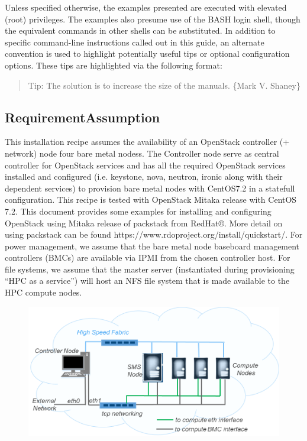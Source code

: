 \documentclass[12pt]{article}
\begin{document}
Unless specified otherwise, the examples presented are executed with elevated (root) privileges. The
examples also presume use of the BASH login shell, though the equivalent commands in other shells can
be substituted. In addition to specific command-line instructions called out in this guide, an alternate
convention is used to highlight potentially useful tips or optional configuration options. These tips are
highlighted via the following format:

\begin{quote}Tip:
\small{The solution is to increase the size of the manuals. \{Mark V. Shaney\}} 
\end{quote}


\subsection*{RequirementAssumption}

This installation recipe assumes the availability of an OpenStack controller (+ network) node four bare metal nodess. The Controller node serve as central controller for OpenStack services and has all the required OpenStack services installed and configured (i.e. keystone, nova, neutron, ironic along with their dependent services) to provision bare metal nodes with CentOS7.2 in a statefull configuration. 
This recipe is tested with OpenStack Mitaka release with CentOS 7.2. This document provides some examples for installing and configuring OpenStack using Mitaka release of packstack from RedHat®. More detail on using packstack can be found https://www.rdoproject.org/install/quickstart/. 
For power management, we assume that the bare metal node baseboard management controllers (BMCs) are available via IPMI from the chosen controller host. For file systems, we assume that the master server (instantiated during provisioning “HPC as a service”) will host an NFS file system that is made available to the HPC compute nodes.

\begin{figure}
	\centering
	\includegraphics{./figures/HPCaaS-diagram}
	\caption[Openstack node example]{}
	\caption{}
	\label{fig:hpcaas-diagram}
\end{figure}
\end{document}
